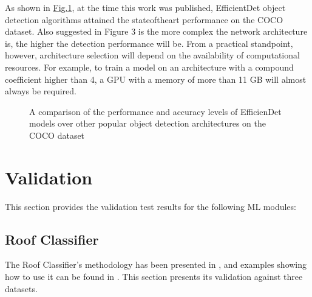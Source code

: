 \documentclass[letterpaper,10pt,english]{sphinxmanual}
\begin{document}
\sphinxAtStartPar
As shown in \hyperref[\detokenize{common/technical_manual/nfloorTheory:fig-efficientdetperf}]{Fig.\@ \ref{\detokenize{common/technical_manual/nfloorTheory:fig-efficientdetperf}}}, at the time this work was published, EfficientDet object detection algorithms attained the state\sphinxhyphen{}of\sphinxhyphen{}the\sphinxhyphen{}art performance on the COCO dataset. Also suggested in Figure 3 is the more complex the network architecture is, the higher the detection performance will be. From a practical standpoint, however, architecture selection will depend on the availability of computational resources. For example, to train a model on an architecture with a compound coefficient higher than 4, a GPU with a memory of more than 11 GB will almost always be required.

\begin{figure}[htbp]
\centering
\capstart

\noindent{}
\caption{A comparison of the performance and accuracy levels of EfficienDet models over other popular object detection architectures on the COCO dataset}\label{\detokenize{common/technical_manual/nfloorTheory:id2}}\label{\detokenize{common/technical_manual/nfloorTheory:fig-efficientdetperf}}\end{figure}


\section{Validation}
\label{\detokenize{common/technical_manual/vnv:validation}}\label{\detokenize{common/technical_manual/vnv:lbl-vnv}}\label{\detokenize{common/technical_manual/vnv::doc}}
\sphinxAtStartPar
This section provides the validation test results for the following ML modules:


\subsection{Roof Classifier}
\label{\detokenize{common/technical_manual/roof:roof-classifier}}\label{\detokenize{common/technical_manual/roof:lbl-roofclassifier-vnv}}\label{\detokenize{common/technical_manual/roof::doc}}
\sphinxAtStartPar
The Roof Classifier’s methodology has been presented in {\hyperref[\detokenize{common/technical_manual/roofTheory:rooftheory}]{}}, and examples showing how to use it can be found in {\hyperref[\detokenize{common/user_manual/modules/roofClassifier:lbl-roofclassifier}]{}}.
This section presents its validation against three datasets.
\end{document}
